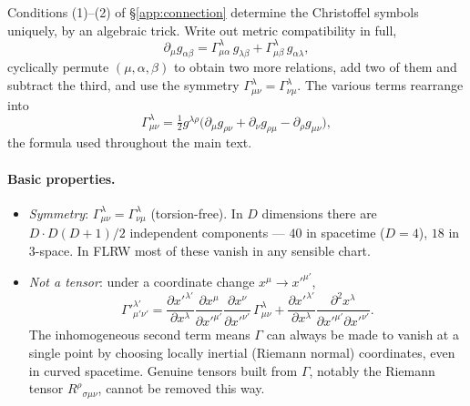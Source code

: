 \documentclass[12pt]{article}
\begin{document}
Conditions (1)--(2) of \S\ref{app:connection} determine the
Christoffel symbols uniquely, by an algebraic trick.  Write out
metric compatibility in full,
%
\begin{equation}
  \partial_\mu g_{\alpha\beta}
  = \Gamma^\lambda_{\mu\alpha}\,g_{\lambda\beta}
  + \Gamma^\lambda_{\mu\beta}\,g_{\alpha\lambda},
  \label{eq:metric_comp}
\end{equation}
%
cyclically permute $(\mu,\alpha,\beta)$ to obtain two more relations,
add two of them and subtract the third, and use the symmetry
$\Gamma^\lambda_{\mu\nu} = \Gamma^\lambda_{\nu\mu}$.  The various
terms rearrange into
%
\begin{equation}
  \boxed{\;
  \Gamma^\lambda_{\mu\nu}
  = \tfrac{1}{2}g^{\lambda\rho}\bigl(\partial_\mu g_{\rho\nu}
    + \partial_\nu g_{\rho\mu} - \partial_\rho g_{\mu\nu}\bigr),
  \;}
  \label{eq:christoffel_formula}
\end{equation}
%
the formula used throughout the main text.

\paragraph{Basic properties.}
\begin{itemize}
  \item \emph{Symmetry}: $\Gamma^\lambda_{\mu\nu} = \Gamma^\lambda_{\nu\mu}$
    (torsion-free).  In $D$ dimensions there are $D\cdot D(D+1)/2$
    independent components --- $40$ in spacetime ($D=4$), $18$ in
    3-space.  In FLRW most of these vanish in any sensible chart.
  \item \emph{Not a tensor}: under a coordinate change $x^\mu\to
    x'^{\mu'}$,
    \begin{equation}
      \Gamma'^{\lambda'}_{\mu'\nu'}
      = \frac{\partial x'^{\lambda'}}{\partial x^\lambda}
        \frac{\partial x^\mu}{\partial x'^{\mu'}}
        \frac{\partial x^\nu}{\partial x'^{\nu'}}\,
        \Gamma^\lambda_{\mu\nu}
      + \frac{\partial x'^{\lambda'}}{\partial x^\lambda}
        \frac{\partial^2 x^\lambda}{\partial x'^{\mu'}\partial x'^{\nu'}}.
    \end{equation}
    The inhomogeneous second term means $\Gamma$ can always be made
    to vanish at a single point by choosing locally inertial (Riemann
    normal) coordinates, even in curved spacetime.  Genuine tensors
    built from $\Gamma$, notably the Riemann tensor
    $R^\rho{}_{\sigma\mu\nu}$, cannot be removed this way.
\end{itemize}
\end{document}
